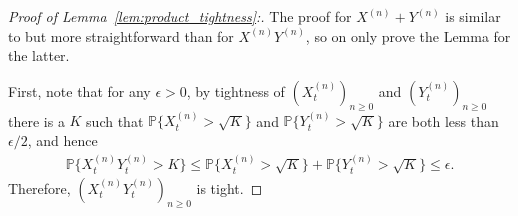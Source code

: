 \documentclass[EJP]{ejpecp} %
\newcommand{\IP}{\mathbb P}
\begin{document}
\begin{proof}[Proof of Lemma~\ref{lem:product_tightness}:]
    The proof for $X^{(n)} + Y^{(n)}$ is similar to but more straightforward than
    for $X^{(n)} Y^{(n)}$, so on only prove the Lemma for the latter.

    First, note that for any $\epsilon > 0$, by tightness of $(X^{(n)}_t)_{n\ge0}$ and $(Y^{(n)}_t)_{n\ge0}$
    there is a $K$ such that
    $\IP\{ X^{(n)}_t > \sqrt{K} \}$ and $\IP\{ Y^{(n)}_t > \sqrt{K} \}$
    are both less than $\epsilon/2$,
    and hence
    \begin{align*}
        \IP\{
            X^{(n)}_t Y^{(n)}_t > K
        \}
        \le
        \IP\{
            X^{(n)}_t > \sqrt{K}
        \}
        +
        \IP\{
            Y^{(n)}_t > \sqrt{K}
        \} 
        \le \epsilon.
    \end{align*}
    Therefore, $(X^{(n)}_t Y^{(n)}_t)_{n \ge 0}$ is tight.


\end{proof}
\end{document}
